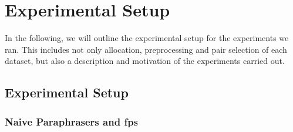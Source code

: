 \chapter{Experimental Setup}
\label{chap:experimental_setup}

In the following, we will outline the experimental setup for the experiments we ran.
This includes not only allocation, preprocessing and pair selection of each dataset, but also a description and motivation of the experiments carried out.






\section{Experimental Setup}
\label{sec:experimental_setup}









\subsection{Naive Paraphrasers and \acp{fp}}









